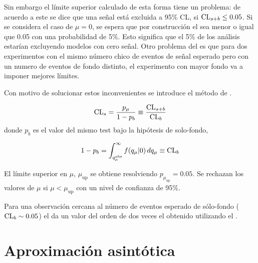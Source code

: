 Sin embargo el límite superior calculado de esta forma tiene un problema: de
acuerdo a este se dice que una señal está excluida a 95\% CL, si ${\text{CL}_{s+b}} \leq
0.05$. Si se considera el caso de $\mu=0$, se espera que por construcción el
{\clsb} sea menor o igual que 0.05 con una probabilidad de 5\%. Esto significa
que el 5\% de los análisis estarían excluyendo modelos con cero señal. Otro
problema del {\clsb} es que para dos experimentos con el mismo número chico de
eventos de señal esperado pero con un numero de eventos de fondo distinto, el
experimento con mayor fondo va a imponer mejores límites.

Con motivo de solucionar estos inconvenientes se introduce el método de {\cls}\cite{ReadCLs}.


\begin{equation}
  \text{CL}_s = \frac{p_\mu}{1-p_b}  \equiv \frac{\text{CL}_{s+b}}{\text{CL}_b}
\end{equation}
%
donde $p_b$ es el valor del mismo test bajo la hipótesis de solo-fondo,

\begin{equation}
  1 - p_b = \int_{q_\mu^\text{obs}}^{\infty}
  f({q}_\mu|0) \, dq_\mu \equiv \text{CL}_b
\end{equation}

El límite superior {\cls} en $\mu$, $\mu_\text{up}$ se obtiene resolviendo
$p_{\mu_\text{up}} = 0.05$. Se rechazan los valores de $\mu$ si $\mu <
\mu_\text{up}$ con un nivel de confianza de 95\%.

Para una observación cercana al número de eventos esperado de sólo-fondo ($\text{CL}_b
\sim 0.05$) el {\cls} da un valor del orden de dos veces el obtenido utilizando
el {\clsb}.


\section{Aproximación asintótica}\label{sec:aprox}

